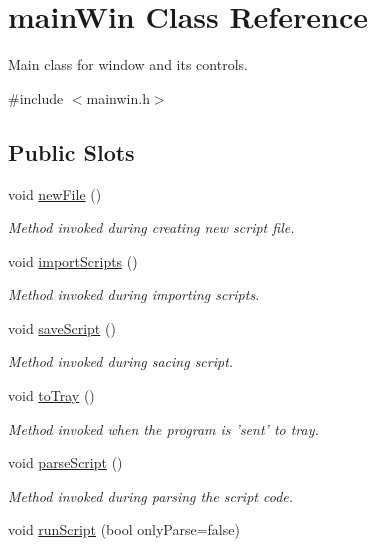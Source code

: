 \hypertarget{classmain_win}{\section{main\-Win Class Reference}
\label{classmain_win}
}


Main class for window and its controls.  




{\ttfamily \#include $<$mainwin.\-h$>$}

\subsection*{Public Slots}
\begin{DoxyCompactItemize}
\item 
void \hyperlink{classmain_win_a5a5ebff7e72fcf1a9d840d8030b535b3}{new\-File} ()
\begin{DoxyCompactList}\small\item\em Method invoked during creating new script file. \end{DoxyCompactList}\item 
void \hyperlink{classmain_win_a1de1fce6f04475bd5baf2006ba93f6a0}{import\-Scripts} ()
\begin{DoxyCompactList}\small\item\em Method invoked during importing scripts. \end{DoxyCompactList}\item 
void \hyperlink{classmain_win_a647971cd2796a848d88990680ca8c47f}{save\-Script} ()
\begin{DoxyCompactList}\small\item\em Method invoked during sacing script. \end{DoxyCompactList}\item 
void \hyperlink{classmain_win_a605bc5e184abd3eadb21338970927046}{to\-Tray} ()
\begin{DoxyCompactList}\small\item\em Method invoked when the program is 'sent' to tray. \end{DoxyCompactList}\item 
void \hyperlink{classmain_win_a2a999b0788004515727182350242d6bc}{parse\-Script} ()
\begin{DoxyCompactList}\small\item\em Method invoked during parsing the script code. \end{DoxyCompactList}\item 
void \hyperlink{classmain_win_a1971e30e143e696271ee2ec1f1cf998e}{run\-Script} (bool only\-Parse=false)

\end{DoxyCompactItemize}
